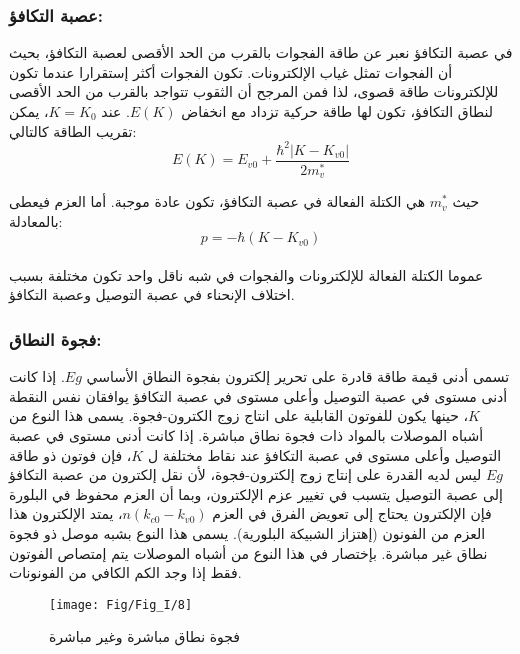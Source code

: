 \subsubsection{عصبة التكافؤ:}
في عصبة التكافؤ نعبر عن طاقة الفجوات بالقرب من الحد الأقصى لعصبة التكافؤ، بحيث أن الفجوات تمثل غياب الإلكترونات. تكون الفجوات أكثر إستقرارا عندما تكون للإلكترونات طاقة قصوى، لذا فمن المرجح أن الثقوب تتواجد بالقرب من الحد الأقصى لنطاق التكافؤ، تكون لها طاقة حركية تزداد مع انخفاض $ E(K) $. عند $ K=K_0 $، يمكن تقريب الطاقة كالتالي:
\begin{equation}
	E\left( K \right) = E_{v0} + \dfrac{ 
		\hbar^{2} \left| K-K_{v0} \right| }{2m^{*}_v}
\end{equation}

حيث $ m^{*}_v $ هي الكتلة الفعالة في عصبة التكافؤ، تكون عادة موجبة. أما العزم فيعطى بالمعادلة:
\begin{equation}
	p= - \hbar \left( K-K_{v0} \right) 
\end{equation}
\\
عموما الكتلة الفعالة للإلكترونات والفجوات في شبه ناقل واحد تكون مختلفة بسبب اختلاف الإنحناء في عصبة التوصيل وعصبة التكافؤ.

\subsubsection{فجوة النطاق:}

تسمى أدنى قيمة طاقة قادرة على تحرير إلكترون بفجوة النطاق الأساسي $ Eg $. إذا كانت أدنى مستوى في عصبة التوصيل وأعلى مستوى في عصبة التكافؤ يوافقان نفس النقطة $ K $، حينها يكون للفوتون القابلية على انتاج زوج الكترون-فجوة. يسمى هذا النوع من أشباه الموصلات بالمواد ذات فجوة نطاق مباشرة.
إذا كانت أدنى مستوى في عصبة التوصيل وأعلى مستوى في عصبة التكافؤ عند نقاط مختلفة ل $ K $، فإن فوتون ذو طاقة $ Eg $ ليس لديه القدرة على إنتاج زوج إلكترون-فجوة، لأن نقل إلكترون من عصبة التكافؤ إلى عصبة التوصيل يتسبب في تغيير عزم الإلكترون، وبما أن العزم محفوظ في البلورة فإن الإلكترون يحتاج إلى تعويض الفرق في العزم $ n(k_{c0}-k_{v0})  $، يمتد الإلكترون هذا العزم من الفونون (إهتزاز الشبيكة البلورية). يسمى هذا النوع بشبه موصل ذو فجوة نطاق غير مباشرة. بإختصار في هذا النوع من أشباه الموصلات يتم إمتصاص الفوتون فقط إذا وجد الكم الكافي من الفونونات.
\begin{figure}[h!]
	\centering
	\texttt{[image: Fig/Fig\_I/8]}
	\caption{فجوة نطاق مباشرة وغير مباشرة}
	\label{fig:8}
\end{figure}
\FloatBarrier
